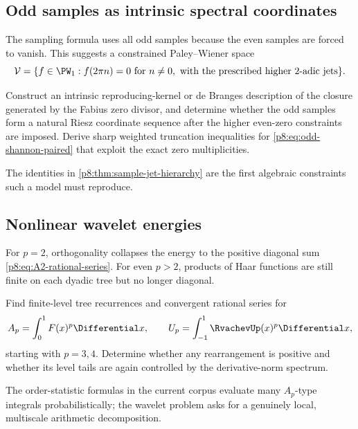 \documentclass[11pt]{article}
\theoremstyle{definition}
\theoremstyle{remark}
\begin{document}
\subsection{Odd samples as intrinsic spectral coordinates}

The sampling formula uses all odd samples because the even samples are forced
to vanish.  This suggests a constrained Paley--Wiener space
\begin{equation}
 \mathcal V=\{f\in\PW_1:f(2\pi n)=0\text{ for }n\ne0,
 \text{ with the prescribed higher }2\text{-adic jets}\}.              \label{p8:eq:constrained-PW}
\end{equation}

\begin{openproblem}
Construct an intrinsic reproducing-kernel or de Branges description of the
closure generated by the Fabius zero divisor, and determine whether the odd
samples form a natural Riesz coordinate sequence after the higher even-zero
constraints are imposed.  Derive sharp weighted truncation inequalities for
\eqref{p8:eq:odd-shannon-paired} that exploit the exact zero multiplicities.
\end{openproblem}

The identities in \cref{p8:thm:sample-jet-hierarchy} are the first algebraic
constraints such a model must reproduce.

\subsection{Nonlinear wavelet energies}

For $p=2$, orthogonality collapses the energy to the positive diagonal sum
\eqref{p8:eq:A2-rational-series}.  For even $p>2$, products of Haar functions are
still finite on each dyadic tree but no longer diagonal.

\begin{openproblem}
Find finite-level tree recurrences and convergent rational series for
\[
 A_p=\int_0^1F(x)^p\Differential x,
 \qquad
 U_p=\int_{-1}^{1}\RvachevUp(x)^p\Differential x,
\]
starting with $p=3,4$.  Determine whether any rearrangement is positive and
whether its level tails are again controlled by the derivative-norm spectrum.
\end{openproblem}

The order-statistic formulas in the current corpus evaluate many $A_p$-type
integrals probabilistically; the wavelet problem asks for a genuinely local,
multiscale arithmetic decomposition.
\end{document}
